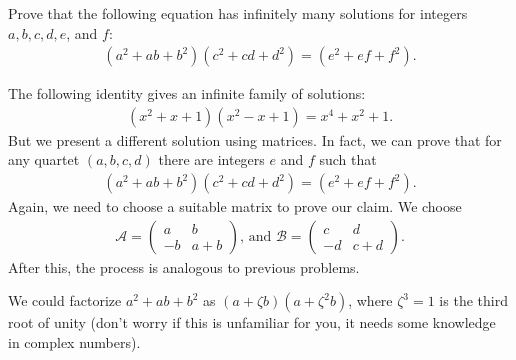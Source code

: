 \documentclass{subfile}
\begin{document}
\begin{problem}
Prove that the following equation has infinitely many solutions for integers $a,b,c,d,e$, and $f$:
\begin{align*}
(a^2+ab+b^2)(c^2+cd+d^2)=(e^2+ef+f^2).
\end{align*}
\end{problem}

\begin{solution}
The following identity gives an infinite family of solutions:
\begin{align*}
(x^2+x+1)(x^2-x+1)=x^4+x^2+1.
\end{align*}
But we present a different solution using matrices. In fact, we can prove that for any quartet $(a,b,c,d)$ there are integers $e$ and $f$ such that
\begin{align*}
(a^2+ab+b^2)(c^2+cd+d^2)=(e^2+ef+f^2).
\end{align*}
Again, we need to choose a suitable matrix to prove our claim. We choose 
\begin{align*}
\mathcal{A}=\begin{pmatrix}
a & b\\
-b & a+b
\end{pmatrix}\text{, and }
\mathcal{B}=\begin{pmatrix}
c & d\\
-d & c+d
\end{pmatrix}.
\end{align*}
After this, the process is analogous to previous problems.
\end{solution}

\begin{note}
We could factorize $a^2+ab+b^2$ as $(a+\zeta b)(a+\zeta^2b)$, where $\zeta^3=1$ is the third root of unity (don't worry if this is unfamiliar for you, it needs some knowledge in complex numbers).
\end{note}
\end{document}
